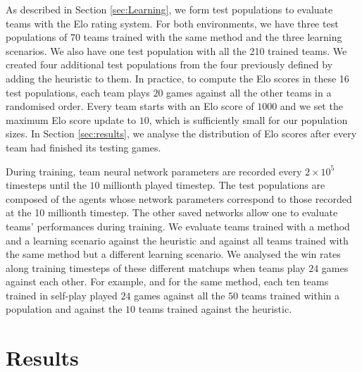 As described in Section \ref{sec:Learning}, we form test populations to evaluate teams with the Elo rating system.
For both environments, we have three test populations of 70 teams trained with the same method and the three learning scenarios.
We also have one test population with all the 210 trained teams.
We created four additional test populations from the four previously defined by adding the heuristic to them.
In practice, to compute the Elo scores in these 16 test populations, each team plays $20$ games against all the other teams in a randomised order.
Every team starts with an Elo score of $1000$ and we set the maximum Elo score update to $10$, which is sufficiently small for our population sizes.
In Section \ref{sec:results}, we analyse the distribution of Elo scores after every team had finished its testing games.

During training, team neural network parameters are recorded every $2\times10^5$ timesteps until the $10$ millionth played timestep.
The test populations are composed of the agents whose network parameters correspond to those recorded at the 10 millionth timestep.
The other saved networks allow one to evaluate teams' performances during training.
We evaluate teams trained with a method and a learning scenario against the heuristic and against all teams trained with the same method but a different learning scenario.
We analysed the win rates along training timesteps of these different matchups when teams play $24$ games against each other.
For example, and for the same method, each ten teams trained in self-play played $24$ games against all the $50$ teams trained within a population and against the $10$ teams trained against the heuristic.

\section{Results}

